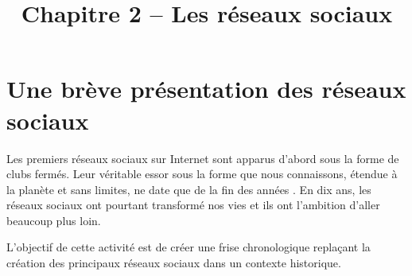 \documentclass[a4paper, dvipsnames]{article}
\title{Chapitre 2 -- Les réseaux sociaux}
\author{}
\date{}
\begin{document}
\renewcommand{\contentsname}{}

\pagestyle{fancy}

\begin{tcolorbox}[colframe=blue!75, colback=blue!45, valign=center, height=1.5cm, top=5mm]
  \maketitle
\end{tcolorbox}

\tableofcontents

\vspace{1cm}

\thispagestyle{fancy}

\section{Une brève présentation des réseaux sociaux}

Les premiers réseaux sociaux sur Internet sont apparus d'abord sous la forme de clubs fermés. Leur véritable essor sous la forme que nous connaissons, étendue à la planète et sans limites, ne date que de la fin des années . En dix ans, les réseaux sociaux ont pourtant transformé nos vies et ils ont l'ambition d'aller beaucoup plus loin.

\bigskip

L'objectif de cette activité est de créer une frise chronologique replaçant la création des principaux réseaux sociaux dans un contexte historique.
\bigskip
\end{document}

